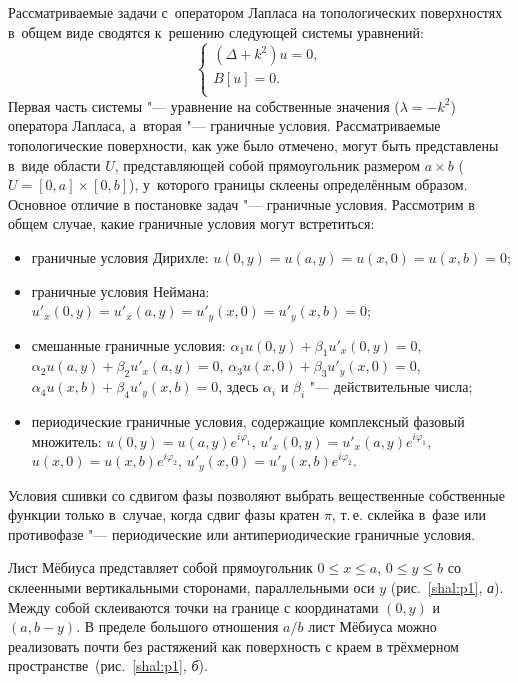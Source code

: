 \smallskip

Рассматриваемые задачи с~оператором Лапласа на топологических поверхностях в~общем виде сводятся к~решению следующей системы уравнений:
$$
\left\{
   \begin{array}{r}
    (\Delta+k^2)u=0,\\
      B[u]  =0.\\
   \end{array}
  \right.
$$
Первая часть системы "--- уравнение на собственные значения ($\lambda=-k^2$) оператора Лапласа, а~вторая "--- граничные условия.
Рассматриваемые топологические поверхности, как уже было отмечено, могут быть представлены в~виде области $U$, представляющей собой прямоугольник размером $a {\times} b$ ($U=[0, a] \times [0, b]$), у~которого границы склеены определённым образом.
Основное отличие в постановке задач "--- граничные условия. Рассмотрим в общем случае, какие граничные условия могут встретиться:
\begin{itemize}
\item граничные условия Дирихле: $u(0, y)=u(a, y)=u(x, 0)=u(x, b)=0$;
\item граничные условия Неймана: \mbox{$u'_x(0, y)=u'_x(a, y)=u'_y(x, 0)=u'_y(x, b)=0$;}
\item смешанные граничные условия: $\alpha_1u(0, y)+\beta_1u'_x(0, y)=0$, $\alpha_2u(a, y)+\beta_2u'_x(a, y)=0$,
$\alpha_3u(x, 0)+\beta_3u'_y(x, 0)=0$, $\alpha_4u(x, b)+\beta_4u'_y(x, b)=0$, здесь $\alpha_i$ и $\beta_i$ "--- действительные числа;
\item периодические граничные условия, содержащие
комплексный фазовый множитель: $u(0,y)=u(a,y)e^{i\varphi_1}$, $u'_x(0,y)=u'_x(a,y)e^{i\varphi_1}$,
$u(x,0)=u(x,b)e^{i\varphi_2}$, $u'_y(x,0)=u'_y(x,b)e^{i\varphi_2}.$
\end{itemize}
Условия сшивки со сдвигом фазы позволяют выбрать вещественные собственные функции только в~случае, когда сдвиг фазы кратен $\pi$, т.\,е. склейка в~фазе или противофазе "--- периодические или антипериодические граничные условия.

\smallskip


Лист Мёбиуса представляет собой прямоугольник $0\leq x\leq a$, $0\leq y\leq b$ со склеенными вертикальными сторонами, параллельными оси $y$ (рис.~\ref{shal:p1}, {\sl а}).
Между собой склеиваются точки на границе с координатами $(0, y)$ и $(a, b-y)$.
В пределе большого отношения $a/b$ лист Мёбиуса можно реализовать почти без растяжений как поверхность с краем в трёхмерном пространстве~(рис.~\ref{shal:p1}, {\sl б}).


